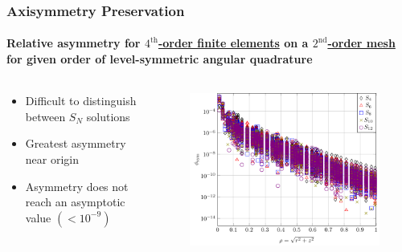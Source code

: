 \documentclass[compress,t]{beamer}
\begin{document}
\begin{frame}[t]
\frametitle{Axisymmetry Preservation}
\framesubtitle{Relative asymmetry for \underline{$4^\text{th}$-order finite elements} on a \underline{$2^\text{nd}$-order mesh} for given order of level-symmetric angular quadrature}

\begin{columns}[T]

\begin{column}{0.4\textwidth}
\begin{itemize}
\item{Difficult to distinguish between $S_N$ solutions}
\item{Greatest asymmetry near origin}
\item{Asymmetry does not reach an asymptotic value $(<10^{-9})$}
\end{itemize}

\end{column}

\begin{column}{0.6\textwidth}
\begin{figure}
\flushright
\includegraphics[scale=0.6]{./graphics/RZASMMSLinearRhoBrunnerp4g2r2.pdf}
\end{figure}

\end{column}

\end{columns}

\end{frame}

\end{document}
